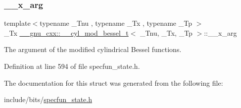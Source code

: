 \subsubsection{\texorpdfstring{\+\_\+\+\_\+x\+\_\+arg}{\_\_x\_arg}}
{\footnotesize\ttfamily template$<$typename \+\_\+\+Tnu , typename \+\_\+\+Tx , typename \+\_\+\+Tp $>$ \\
\+\_\+\+Tx \hyperlink{struct____gnu__cxx_1_1____cyl__mod__bessel__t}{\+\_\+\+\_\+gnu\+\_\+cxx\+::\+\_\+\+\_\+cyl\+\_\+mod\+\_\+bessel\+\_\+t}$<$ \+\_\+\+Tnu, \+\_\+\+Tx, \+\_\+\+Tp $>$\+::\+\_\+\+\_\+x\+\_\+arg}



The argument of the modified cylindrical Bessel functions. 



Definition at line 594 of file specfun\+\_\+state.\+h.



The documentation for this struct was generated from the following file\+:\begin{DoxyCompactItemize}
\item 
include/bits/\hyperlink{specfun__state_8h}{specfun\+\_\+state.\+h}\end{DoxyCompactItemize}
